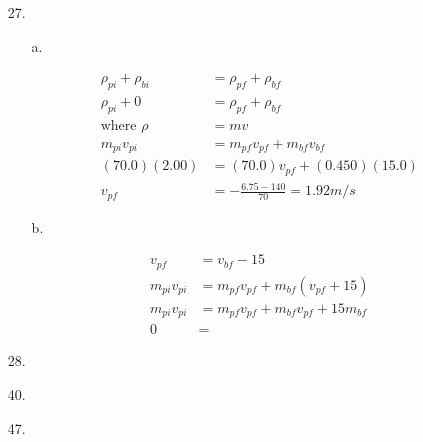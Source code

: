     \begin{itemize}
        \item [27.]
        
        \begin{itemize}
            \item [a.]
            
            \begin{align*}
                \rho_{pi} + \rho_{bi}   & = \rho_{pf} + \rho_{bf}       \\
                \rho_{pi} + 0           & = \rho_{pf} + \rho_{bf}       \\
                \text{where } \rho      & = mv                          \\
                m_{pi}v_{pi}            & = m_{pf}v_{pf} + m_{bf}v_{bf} \\
                (70.0)(2.00)            & = (70.0)v_{pf} + (0.450)(15.0)\\
                v_{pf}                  & = -\frac{6.75-140}{70} = \boxed{1.92m/s}
            \end{align*}

            \item [b.]
            
            \begin{align*}
                v_{pf}                  & = v_{bf} - 15                 \\
                m_{pi}v_{pi}            & = m_{pf}v_{pf} 
                                          + m_{bf}(v_{pf} + 15)         \\
                m_{pi}v_{pi}            & = m_{pf}v_{pf} 
                                          + m_{bf}v_{pf} + 15m_{bf}     \\
                0                       & = 
            \end{align*}

        \end{itemize}

        \item [28.]
        \item [40.]
        \item [47.]
    \end{itemize}

